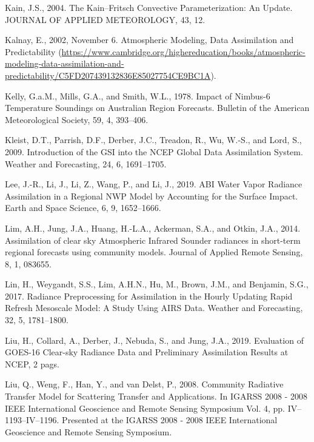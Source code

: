 \documentclass[12pt,oneside]{reedthesis}
\begin{document}
\leavevmode\hypertarget{ref-kain2004}{}%
Kain, J.S., 2004. The Kain--Fritsch Convective Parameterization: An Update. JOURNAL OF APPLIED METEOROLOGY, 43, 12.

\leavevmode\hypertarget{ref-kalnay2002}{}%
Kalnay, E., 2002, November 6. Atmospheric Modeling, Data Assimilation and Predictability (\url{https://www.cambridge.org/highereducation/books/atmospheric-modeling-data-assimilation-and-predictability/C5FD207439132836E85027754CE9BC1A}).

\leavevmode\hypertarget{ref-kelly1978}{}%
Kelly, G.a.M., Mills, G.A., and Smith, W.L., 1978. Impact of Nimbus-6 Temperature Soundings on Australian Region Forecasts. Bulletin of the American Meteorological Society, 59, 4, 393--406.

\leavevmode\hypertarget{ref-kleist2009}{}%
Kleist, D.T., Parrish, D.F., Derber, J.C., Treadon, R., Wu, W.-S., and Lord, S., 2009. Introduction of the GSI into the NCEP Global Data Assimilation System. Weather and Forecasting, 24, 6, 1691--1705.

\leavevmode\hypertarget{ref-lee2019}{}%
Lee, J.-R., Li, J., Li, Z., Wang, P., and Li, J., 2019. ABI Water Vapor Radiance Assimilation in a Regional NWP Model by Accounting for the Surface Impact. Earth and Space Science, 6, 9, 1652--1666.

\leavevmode\hypertarget{ref-lim2014}{}%
Lim, A.H., Jung, J.A., Huang, H.-L.A., Ackerman, S.A., and Otkin, J.A., 2014. Assimilation of clear sky Atmospheric Infrared Sounder radiances in short-term regional forecasts using community models. Journal of Applied Remote Sensing, 8, 1, 083655.

\leavevmode\hypertarget{ref-lin2017a}{}%
Lin, H., Weygandt, S.S., Lim, A.H.N., Hu, M., Brown, J.M., and Benjamin, S.G., 2017. Radiance Preprocessing for Assimilation in the Hourly Updating Rapid Refresh Mesoscale Model: A Study Using AIRS Data. Weather and Forecasting, 32, 5, 1781--1800.

\leavevmode\hypertarget{ref-liu2019}{}%
Liu, H., Collard, A., Derber, J., Nebuda, S., and Jung, J.A., 2019. Evaluation of GOES-16 Clear-sky Radiance Data and Preliminary Assimilation Results at NCEP, 2 pags.

\leavevmode\hypertarget{ref-liu2008}{}%
Liu, Q., Weng, F., Han, Y., and van Delst, P., 2008. Community Radiative Transfer Model for Scattering Transfer and Applications. In IGARSS 2008 - 2008 IEEE International Geoscience and Remote Sensing Symposium Vol. 4, pp. IV--1193--IV--1196. Presented at the IGARSS 2008 - 2008 IEEE International Geoscience and Remote Sensing Symposium.
\end{document}
